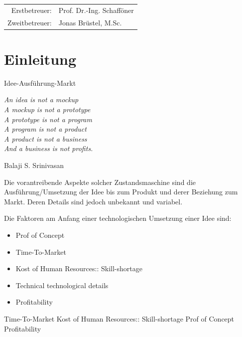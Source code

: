 \documentclass[
12pt,
english,
ngerman,
headsepline,
twoside,
openright,
numbers=noenddot,version=first
]{scrreprt}
\providecommand{\tabularnewline}{\\}
\let\myTOC\tableofcontents
\renewcommand\tableofcontents{
\begin{spacing}{1.1}
\myTOC
\end{spacing}
\clearpage
\pagenumbering{arabic}
}
\begin{document}
\vspace{1cm}

\noindent \begin{center}
\medskip{}
\begin{tabular}{rl}
Erstbetreuer: & Prof. Dr.-Ing. Schafföner\tabularnewline
Zweitbetreuer: & Jonas Brüstel, M.Sc.\tabularnewline
\end{tabular}
\par\end{center}

\noindent \begin{center}
{\huge }
\par\end{center}{\huge \par}

\newpage{}

%
\tableofcontents{}

\pagestyle{scrheadings}


\chapter{Einleitung}{Idee-Ausführung-Markt}
\setcounter{page}{1}
\label{chap:introduction}
\epigraph{\textit{\textquotedbl{}
An idea is not a mockup\\
A mockup is not a prototype\\
A prototype is not a program\\
A program is not a product\\
A product is not a business\\
And a business is not profits.\textquotedbl{}}}{
Balaji S. Srinivasan }


Die vorantreibende Aspekte solcher Zustandsmaschine sind die Ausführung/Umsetzung der Idee bis zum Produkt und derer Beziehung zum Markt. Deren Details sind jedoch unbekannt und variabel.

Die Faktoren am Anfang einer technologischen Umsetzung einer Idee sind:
\begin{itemize}
\item Prof of Concept
\item Time-To-Market
\item Kost of Human Resources:: Skill-shortage
\item Technical technological details
\item Profitability
\end{itemize}

Time-To-Market
Kost of Human Resources:: Skill-shortage
Prof of Concept
Profitability
\end{document}
